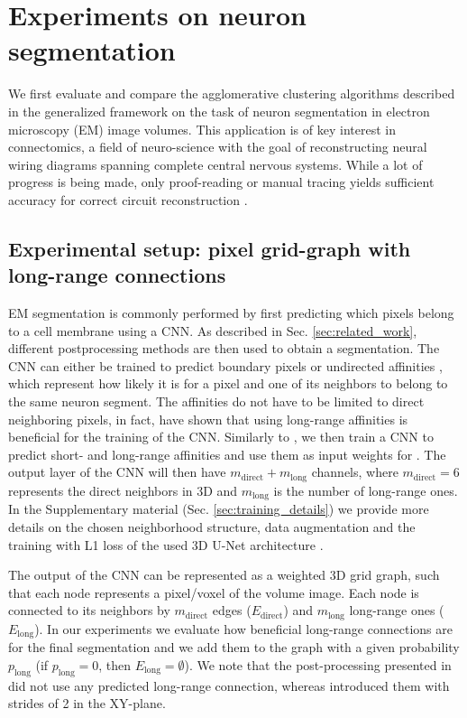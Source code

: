 \section{Experiments on neuron segmentation}\label{sec:neuro_segm_exp}

We first evaluate and compare the agglomerative clustering algorithms described in the generalized framework on the task of neuron segmentation in electron microscopy (EM) image volumes. This application is of key interest in connectomics, a field of neuro-science with the goal of reconstructing neural wiring diagrams spanning complete central nervous systems. While a lot of progress is being made, only proof-reading or manual tracing yields sufficient accuracy for correct circuit reconstruction \cite{schlegel2017learning}.

\subsection{Experimental setup: pixel grid-graph with long-range connections} \label{sec:grid_graph}
EM segmentation is commonly performed by first predicting which pixels belong to a cell membrane using a CNN. As described in Sec. \ref{sec:related_work}, different postprocessing methods are then used to obtain a segmentation. The CNN can either be trained to predict boundary pixels \cite{beier2017multicut,ciresan2012deep} or undirected affinities \cite{wolf2018mutex,lee2017superhuman,funke2018large}, which represent how likely it is for a pixel and one of its neighbors to belong to the same neuron segment. The affinities do not have to be limited to direct neighboring pixels, in fact, \cite{lee2017superhuman} have shown that using long-range affinities is beneficial for the training of the CNN. Similarly to \cite{wolf2018mutex}, we then train a CNN to predict short- and long-range affinities and use them as input weights for \algname{}. The output layer of the CNN will then have $m_{\mathrm{direct}}+m_{\mathrm{long}}$ channels, where $m_{\mathrm{direct}}=6$ represents the direct neighbors in 3D and $m_{\mathrm{long}}$ is the number of long-range ones. In the Supplementary material (Sec. \ref{sec:training_details}) we provide more details on the chosen neighborhood structure, data augmentation and the training with L1 loss of the used 3D U-Net architecture \cite{ronneberger2015u,cciccek20163d}.

The output of the CNN can be represented as a weighted 3D grid graph, such that each node represents a pixel/voxel of the volume image. Each node is connected to its neighbors by $m_{\mathrm{direct}}$ edges ($E_{\mathrm{direct}}$) and $m_{\mathrm{long}}$ long-range ones ($E_{\mathrm{long}}$).
In our experiments we evaluate how beneficial long-range connections are for the final segmentation and we add them to the graph with a given probability $p_{\mathrm{long}}$ (if $p_{\mathrm{long}}=0$, then $E_{\mathrm{long}}=\emptyset$).
We note that the post-processing presented in \cite{lee2017superhuman} did not use any predicted long-range connection, whereas \cite{wolf2018mutex} introduced them with strides of 2 in the XY-plane.

